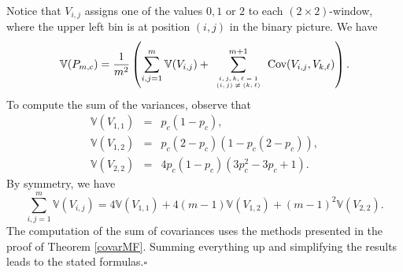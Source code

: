 \documentclass[12pt]{article}
\def\BV{\mathbb{V}}
\begin{document}
Notice that $V_{i,j}$ assigns one of the values $0,1$ or $2$ to each $(2\times 2)$-window, where the upper left bin is at position $(i,j)$ in the binary picture. We have
\begin{equation*}
\BV(P_{m,c})=\frac{1}{m^2}\left(\sum_{i,j=1}^{m}\BV(V_{i,j})+\sum_{\tiny\begin{array}{c}i,j,k,\ell=1\\(i,j)\not=(k,\ell)\end{array}}^{m+1}\mbox{Cov}(V_{i,j},V_{k,\ell})\right).
\end{equation*}
To compute the sum of the variances, observe that
\begin{eqnarray*}
\BV(V_{1,1})&=&p_c(1-p_c),\\
\BV(V_{1,2})&=&p_c(2-p_c)(1-p_c(2-p_c)),\\
\BV(V_{2,2})&=&4p_c(1-p_c)(3p_c^2-3p_c+1).
\end{eqnarray*}
By symmetry, we have
\begin{equation*}
\sum_{i,j=1}^{m}\BV(V_{i,j})=4\BV(V_{1,1})+4(m-1)\BV(V_{1,2})+(m-1)^2\BV(V_{2,2}).
\end{equation*}
The computation of the sum of covariances uses the methods presented in the proof of Theorem \ref{covarMF}. Summing everything up and simplifying the results leads to the stated formulas.\hfill$\square$






\end{document}
